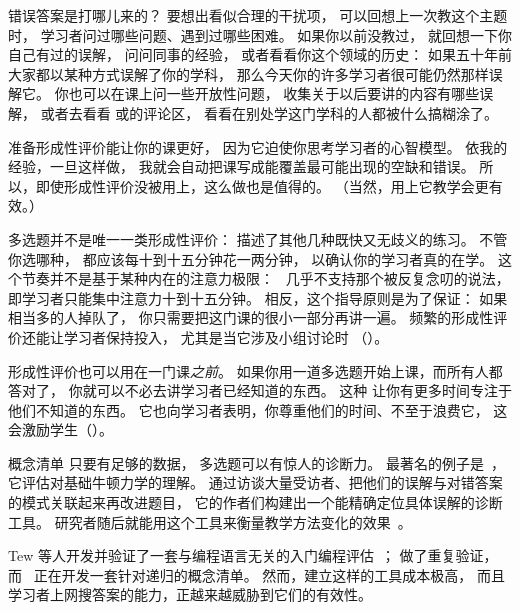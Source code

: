\begin{aside}{错误答案是打哪儿来的？}
  要想出看似合理的干扰项，
  可以回想上一次教这个主题时，
  学习者问过哪些问题、遇到过哪些困难。
  如果你以前没教过，
  就回想一下你自己有过的误解，
  问问同事的经验，
  或者看看你这个领域的历史：
  如果五十年前大家都以某种方式误解了你的学科，
  那么今天你的许多学习者很可能仍然那样误解它。
  你也可以在课上问一些开放性问题，
  收集关于以后要讲的内容有哪些误解，
  或者去看看 或的评论区，
  看看在别处学这门学科的人都被什么搞糊涂了。
\end{aside}

准备形成性评价能让你的课更好，
因为它迫使你思考学习者的心智模型。
依我的经验，一旦这样做，
我就会自动把课写成能覆盖最可能出现的空缺和错误。
所以，即使形成性评价没被用上，这么做也是值得的。
（当然，用上它教学会更有效。）

多选题并不是唯一一类形成性评价：
描述了其他几种既快又无歧义的练习。
不管你选哪种，
都应该每十到十五分钟花一两分钟，
以确认你的学习者真的在学。
这个节奏并不是基于某种内在的注意力极限：
~\cite{Wils2007}几乎不支持那个被反复念叨的说法，
即学习者只能集中注意力十到十五分钟。
相反，这个指导原则是为了保证：
如果相当多的人掉队了，
你只需要把这门课的很小一部分再讲一遍。
频繁的形成性评价还能让学习者保持投入，
尤其是当它涉及小组讨论时
（）。

形成性评价也可以用在一门课\emph{之前}。
如果你用一道多选题开始上课，而所有人都答对了，
你就可以不必去讲学习者已经知道的东西。
这种
让你有更多时间专注于他们不知道的东西。
它也向学习者表明，你尊重他们的时间、不至于浪费它，
这会激励学生（）。

\begin{aside}{概念清单}
  只要有足够的数据，
  多选题可以有惊人的诊断力。
  最著名的例子是~\cite{Hest1992}，
  它评估对基础牛顿力学的理解。
  通过访谈大量受访者、把他们的误解与对错答案的模式关联起来再改进题目，
  它的作者们构建出一个能精确定位具体误解的诊断工具。
  研究者随后就能用这个工具来衡量教学方法变化的效果~\cite{Hake1998}。

  Tew 等人开发并验证了一套与编程语言无关的入门编程评估~\cite{Tew2011}；
  \cite{Park2016} 做了重复验证，
  而~\cite{Hamo2017} 正在开发一套针对递归的概念清单。
  然而，建立这样的工具成本极高，
  而且学习者上网搜答案的能力，正越来越威胁到它们的有效性。
\end{aside}

